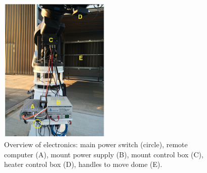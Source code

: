 \documentclass[a4paper, 11pt, fleqn]{memoir}
\begin{document}
\begin{figure}[h!]
    \centering
    \includegraphics[width=0.47\textwidth]{electronics-overview}
    \caption{Overview of electronics: main power switch (circle), remote computer (A), mount power supply (B), mount control box (C), heater control box (D), handles to move dome (E).}
    \label{fig:electronics-overview}
\end{figure}
\end{document}
